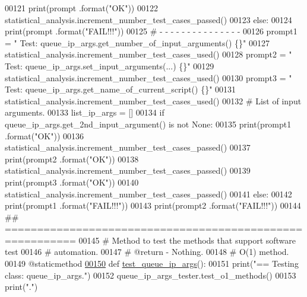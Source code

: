 \begin{DoxyCode}
00121             print(prompt .format(\textcolor{stringliteral}{"OK"}))
00122             statistical\_analysis.increment\_number\_test\_cases\_passed()
00123         \textcolor{keywordflow}{else}:
00124             print(prompt .format(\textcolor{stringliteral}{"FAIL!!!"}))
00125         \textcolor{comment}{#   -   -   -   -   -   -   -   -   -   -   -   -   -   -   -}
00126         prompt1 = \textcolor{stringliteral}{" Test: queue\_ip\_args.get\_number\_of\_input\_arguments() \{\}"}
00127         statistical\_analysis.increment\_number\_test\_cases\_used()
00128         prompt2 = \textcolor{stringliteral}{" Test: queue\_ip\_args.set\_input\_arguments(...)        \{\}"}
00129         statistical\_analysis.increment\_number\_test\_cases\_used()
00130         prompt3 = \textcolor{stringliteral}{" Test: queue\_ip\_args.get\_name\_of\_current\_script()    \{\}"}
00131         statistical\_analysis.increment\_number\_test\_cases\_used()
00132         \textcolor{comment}{#   List of input arguments.}
00133         list\_ip\_args = []
00134         \textcolor{keywordflow}{if} queue\_ip\_args.get\_2nd\_input\_argument() \textcolor{keywordflow}{is} \textcolor{keywordflow}{not} \textcolor{keywordtype}{None}:
00135             print(prompt1 .format(\textcolor{stringliteral}{"OK"}))
00136             statistical\_analysis.increment\_number\_test\_cases\_passed()
00137             print(prompt2 .format(\textcolor{stringliteral}{"OK"}))
00138             statistical\_analysis.increment\_number\_test\_cases\_passed()
00139             print(prompt3 .format(\textcolor{stringliteral}{"OK"}))
00140             statistical\_analysis.increment\_number\_test\_cases\_passed()
00141         \textcolor{keywordflow}{else}:
00142             print(prompt1 .format(\textcolor{stringliteral}{"FAIL!!!"}))
00143             print(prompt2 .format(\textcolor{stringliteral}{"FAIL!!!"}))
00144     \textcolor{comment}{## =========================================================}
00145     \textcolor{comment}{#   Method to test the methods that support software test}
00146     \textcolor{comment}{#       automation.}
00147     \textcolor{comment}{#   @return - Nothing.}
00148     \textcolor{comment}{#   O(1) method.}
00149     @staticmethod
\hypertarget{queue__ip__arguments__tester_8py_source_l00150}{}\hyperlink{classutilities_1_1queue__ip__arguments__tester_1_1queue__ip__args__tester_aee90077323d94238d7f81b23e31207c3}{00150}     \textcolor{keyword}{def }\hyperlink{classutilities_1_1queue__ip__arguments__tester_1_1queue__ip__args__tester_aee90077323d94238d7f81b23e31207c3}{test\_queue\_ip\_args}():
00151         print(\textcolor{stringliteral}{"==   Testing class: queue\_ip\_args."})
00152         queue\_ip\_args\_tester.test\_o1\_methods()
00153         print(\textcolor{stringliteral}{"."})
\end{DoxyCode}
